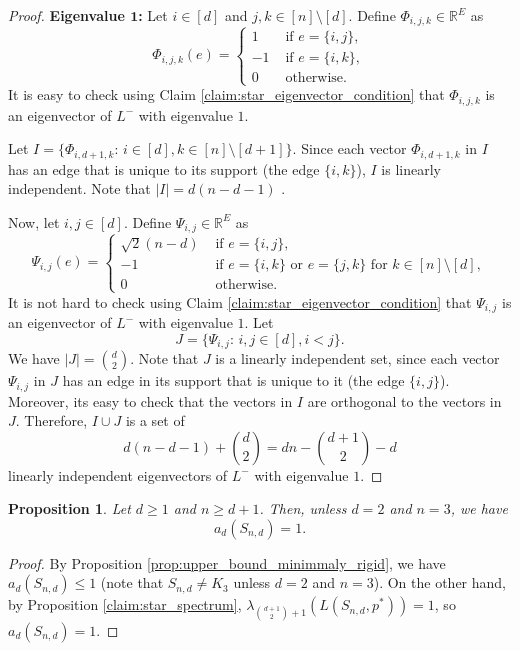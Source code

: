 \documentclass[a4paper,11pt]{article}
\theoremstyle{plain}
\newtheorem{proposition}[theorem]{\bf Proposition}
\theoremstyle{definition}
\newcommand{\Rea}{{\mathbb R}}
\begin{document}
\begin{proof}
\textbf{Eigenvalue $\bm{1}$:} Let $i\in[d]$ and $j,k\in[n]\setminus[d]$. Define $\Phi_{i,j,k}\in \Rea^E$ as
\[
    \Phi_{i,j,k}(e)=\begin{cases}
                        1 & \text{ if } e=\{i,j\},\\
                        -1 & \text{ if } e=\{i,k\},\\
                        0 & \text{ otherwise.}
    \end{cases}
\]
It is easy to check using Claim \ref{claim:star_eigenvector_condition} that $\Phi_{i,j,k}$ is an eigenvector of $L^{-}$ with eigenvalue $1$.

Let $I=\{\Phi_{i,d+1,k}:\, i\in[d], k\in[n]\setminus[d+1]\}$. Since each vector $\Phi_{i,d+1,k}$ in $I$ has an edge that is unique to its support (the edge $\{i,k\}$), $I$ is linearly independent. Note that $|I|=d(n-d-1)$ .

Now, let $i,j\in[d]$. Define $\Psi_{i,j}\in \Rea^E$ as 
\[
    \Psi_{i,j}(e)=\begin{cases}
                    \sqrt{2}(n-d) & \text{ if } e=\{i,j\},\\
                    -1 & \text{ if } e=\{i,k\} \text{ or } e=\{j,k\} \text{ for } k\in[n]\setminus [d],\\
                    0 & \text{ otherwise.}
    \end{cases}
\]
It is not hard to check using Claim \ref{claim:star_eigenvector_condition} that $\Psi_{i,j}$ is an eigenvector of $L^{-}$ with eigenvalue $1$. 
Let
\[
    J=\{ \Psi_{i,j} :\,  i,j\in[d], i<j \}.
\]
We have $|J|=\binom{d}{2}$. Note that $J$ is a linearly independent set, since each vector $\Psi_{i,j}$ in $J$ has an edge in its support that is unique to it (the edge $\{i,j\}$). Moreover, its easy to check that the vectors in $I$ are orthogonal to the vectors in $J$. Therefore, $I\cup J$ is a set of 
\[
    d(n-d-1)+\binom{d}{2}= dn-\binom{d+1}{2}-d
\]
linearly independent eigenvectors of $L^-$ with eigenvalue $1$.
\end{proof}


\begin{proposition}\label{prop:lower_bound_star_graph}
Let $d\geq 1$ and $n\geq d+1$. Then, unless $d=2$ and $n=3$, we have
\[
    a_d(S_{n,d})=1.
\]
\end{proposition}
\begin{proof}
By Proposition \ref{prop:upper_bound_minimmaly_rigid}, we have $a_d(S_{n,d})\leq 1$ (note that $S_{n,d}\neq K_3$ unless $d=2$ and $n=3$).
On the other hand, by Proposition \ref{claim:star_spectrum}, $\lambda_{\binom{d+1}{2}+1}(L(S_{n,d},p^*))=1$, so $a_d(S_{n,d})= 1$.
\end{proof}
\end{document}
